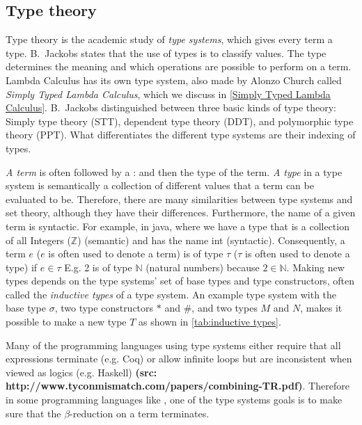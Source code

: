 \subsection{Type theory}
\label{type theory}
Type theory is the academic study of \emph{type systems}, which gives every term a type. B.~Jackobs \autocite[2]{JacobsBart1999Clat} states that the use of types is to classify values. The type determines the meaning and which operations are possible to perform on a term. Lambda Calculus has its own type system, also made by Alonzo Church called \emph{Simply Typed Lambda Calculus}, which we discuss in \autoref{Simply Typed Lambda Calculus}. B.~Jackobs \autocite[3]{JacobsBart1999Clat} distinguished between three basic kinds of type theory: Simply type theory (STT), dependent type theory (DDT), and polymorphic type theory (PPT).  What differentiates the different type systems are their indexing of types.

\para
{}\emph{A term} is often followed by a : and then the type of the term. \emph{A type} in a type system is semantically a collection of different values that a term can be evaluated to be. Therefore, there are many similarities between type systems and set theory, although they have their differences. Furthermore, the name of a given term is syntactic. For example, in java, where we have a type that is a collection of all Integers ($\mathbb{Z}$) (semantic) and has the name int (syntactic). Consequently, a term $e$ ($e$ is often used to denote a term) is of type $\tau$ ($\tau$ is often used to denote a type) if $e \in \tau$ E.g. 2 is of type $\mathbb{N}$ (natural numbers) because $2 \in \mathbb{N}$. Making new types depends on the type systems' set of base types and type constructors, often called the \emph{inductive types} of a type system. An example type system with the base type $\sigma$, two type constructors $*$ and $\#$, and two types $M$ and $N$, makes it possible to make a new type $T$ as shown in \autoref{tab:inductive types}. 

\para
Many of the programming languages using type systems either require that all expressions terminate (e.g. Coq) or allow infinite loops but are inconsistent when viewed as logics (e.g. Haskell) \textbf{(src: http://www.tyconmismatch.com/papers/combining-TR.pdf)}. Therefore in some programming languages like , one of the type systems goals is to make sure that the $\beta$-reduction on a term terminates. 

